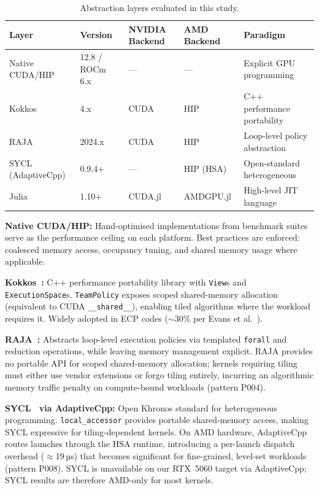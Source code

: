 \begin{table}[h]
\centering
\caption{Abstraction layers evaluated in this study.}
\label{tab:abstractions}
\begin{tabular}{lllll}
\hline
\textbf{Layer} & \textbf{Version} & \textbf{NVIDIA Backend}
& \textbf{AMD Backend} & \textbf{Paradigm} \\
\hline
Native CUDA/HIP & 12.8 / ROCm 6.x & ---  & ---  & Explicit GPU programming \\
Kokkos          & 4.x              & CUDA & HIP  & C++ performance portability \\
RAJA            & 2024.x           & CUDA & HIP  & Loop-level policy abstraction \\
SYCL (AdaptiveCpp) & 0.9.4+       & ---  & HIP (HSA) & Open-standard heterogeneous \\
Julia           & 1.10+            & CUDA.jl & AMDGPU.jl & High-level JIT language \\
\hline
\end{tabular}
\end{table}

\textbf{Native CUDA/HIP:} Hand-optimised implementations from benchmark suites
serve as the performance ceiling on each platform. Best practices are enforced:
coalesced memory access, occupancy tuning, and shared memory usage where
applicable.

\textbf{Kokkos~\cite{Carter2014}:} C++ performance portability library with
\texttt{View}s and \texttt{ExecutionSpace}s. \texttt{TeamPolicy} exposes
scoped shared-memory allocation (equivalent to CUDA \texttt{\_\_shared\_\_}),
enabling tiled algorithms where the workload requires it. Widely adopted in ECP
codes ($\sim$30\% per Evans et al.~\cite{Evans2022}).

\textbf{RAJA~\cite{Hornung2014}:} Abstracts loop-level execution policies via
templated \texttt{forall} and reduction operations, while leaving memory
management explicit. RAJA provides no portable API for scoped shared-memory
allocation; kernels requiring tiling must either use vendor extensions or forgo
tiling entirely, incurring an algorithmic memory traffic penalty on
compute-bound workloads (pattern P004).

\textbf{SYCL~\cite{Reyes2020} via AdaptiveCpp:} Open Khronos standard for
heterogeneous programming. \texttt{local\_accessor} provides portable
shared-memory access, making SYCL expressive for tiling-dependent kernels.
On AMD hardware, AdaptiveCpp routes launches through the HSA runtime,
introducing a per-launch dispatch overhead ($\approx$19\,µs) that becomes
significant for fine-grained, level-set workloads (pattern P008). SYCL is
unavailable on our RTX~5060 target via AdaptiveCpp; SYCL results are therefore
AMD-only for most kernels.

